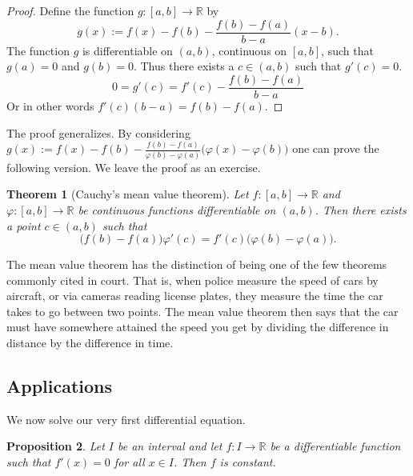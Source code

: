 \documentclass[12pt]{book}
\newcommand{\R}{{\mathbb{R}}}
\theoremstyle{plain}
\newtheorem{thm}{Theorem}[section]
\newtheorem{prop}[thm]{Proposition}
\theoremstyle{remark}
\theoremstyle{definition}
\theoremstyle{exercise}
\theoremstyle{example}
\begin{document}
\begin{proof}
Define the
function $g \colon [a,b] \to \R$ by
\begin{equation*}
g(x) := f(x)-f(b)-\frac{f(b)-f(a)}{b-a}(x-b) .
\end{equation*}
The function $g$ is differentiable on $(a,b)$,
continuous on $[a,b]$, such that $g(a) = 0$ and $g(b) = 0$.  Thus there exists
a
$c \in (a,b)$ such that $g'(c) = 0$.
\begin{equation*}
0 = g'(c) = f'(c)-\frac{f(b)-f(a)}{b-a}
\end{equation*}
Or in other words
$f'(c)(b-a) = f(b)-f(a)$.
\end{proof}

The proof generalizes.  By considering
$g(x) :=
f(x)-f(b)-\frac{f(b)-f(a)}{\varphi(b)-\varphi(a)}\bigl(\varphi(x)-\varphi(b)\bigr)$
one can prove the following version.  We leave the proof as an exercise.

\begin{thm}[Cauchy's mean value theorem] \label{thm:cauchymvt}
Let $f \colon [a,b] \to \R$ and $\varphi \colon [a,b] \to \R$ be continuous
functions
differentiable on $(a,b)$.  Then there exists a point $c \in (a,b)$
such that
\begin{equation*}
\bigl(f(b)-f(a)\bigr)\varphi'(c) = f'(c)\bigl(\varphi(b)-\varphi(a)\bigr) .
\end{equation*}
\end{thm}

The mean value theorem has the distinction of being one of the few theorems
commonly cited
in court.  That is, when police measure the speed of cars by aircraft, or
via cameras reading license plates, they 
measure the time the car takes to go between two points.
The mean value theorem then
says that the car must have somewhere attained the speed you get by dividing the
difference in distance by the difference in time.



\subsection{Applications}

We now solve our very first differential equation.

\begin{prop} \label{prop:derzeroconst}
Let $I$ be an interval and
let $f \colon I \to \R$ be a differentiable function such that $f'(x) = 0$
for all $x \in I$.
Then $f$ is constant.
\end{prop}
\end{document}
